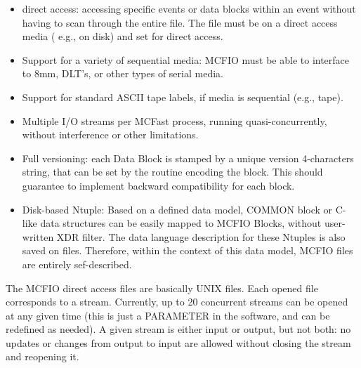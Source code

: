 \begin{itemize}
\item direct access:  accessing specific events or
data blocks within an event without having to scan through the entire file.
The file must be on a direct access media ( e.g., on disk) and set for
direct access.
\item  Support for a variety of sequential media: MCFIO must be able to
interface to 8mm, DLT's, or other types of serial media.
\item  Support for
standard ASCII tape labels, if media is sequential (e.g., tape).
\item  Multiple I/O streams per MCFast process, running quasi-concurrently,
	without interference or other limitations.
\item Full versioning: each Data
Block is stamped by a unique version 4-characters string, that can be set
by the routine encoding the block. This should guarantee to implement
backward compatibility for each block.
\item Disk-based Ntuple: Based on a defined data model, COMMON block or
C-like data structures can be easily mapped to MCFIO Blocks, without
user-written  XDR filter. The data language description for these Ntuples
is also saved on files. Therefore, within the context of this data model,
MCFIO files are entirely sef-described.
\end{itemize}

The MCFIO direct access files are basically UNIX files. Each opened
file corresponds to a stream. Currently, up to 20 concurrent
streams can be opened at any given time (this is just a PARAMETER
in the software, and can be redefined as needed). A given stream is either
input or output, but not both: no updates or changes from output to
input are allowed without closing the stream and reopening it.

